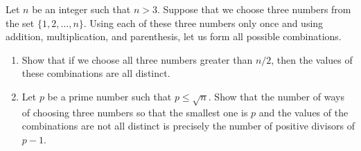 Let $n$ be an integer such that $n > 3$.  Suppose that we choose three numbers from the set $\{1, 2, \ldots, n\}$.  Using each of these three numbers only once and using addition, multiplication, and parenthesis, let us form all possible combinations.
\begin{enumerate}[label=(\alph*)]
	\item Show that if we choose all three numbers greater than $n/2$, then the values of these combinations are all distinct.
	\item Let $p$ be a prime number such that $p \leq \sqrt{n}$.  Show that the number of ways of choosing three numbers so that the smallest one is $p$ and the values of the combinations are not all distinct is precisely the number of positive divisors of $p - 1$.
\end{enumerate}